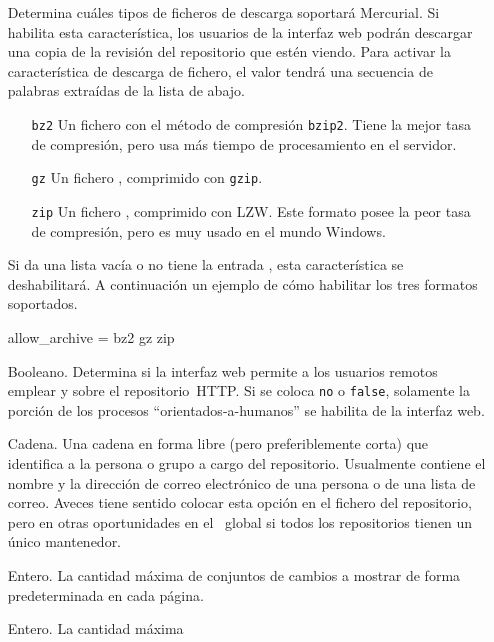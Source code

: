 \begin{itemize}
\item[\rcitem{web}{allow\_archive}] Determina cuáles tipos de ficheros
  de descarga soportará Mercurial.  Si habilita esta característica,
  los usuarios de la interfaz web podrán descargar una copia de la
  revisión del repositorio que estén viendo. Para activar la
  característica de descarga de fichero, el valor tendrá una secuencia
  de palabras extraídas de la lista de abajo.
  \begin{itemize}
  \item[\texttt{bz2}] Un fichero  con el método de
    compresión \texttt{bzip2}.  Tiene la mejor tasa de compresión,
    pero usa más tiempo de procesamiento en el servidor.
  \item[\texttt{gz}] Un fichero , comprimido con
    \texttt{gzip}.
  \item[\texttt{zip}] Un fichero , comprimido con LZW.
    Este formato posee la peor tasa de compresión, pero es muy usado en
    el mundo Windows.
  \end{itemize}
  Si da una lista vacía o no tiene la entrada
  , esta característica se deshabilitará.
  A continuación un ejemplo de cómo habilitar los tres formatos soportados.
  \begin{codesample4}
    [web]
    allow_archive = bz2 gz zip
  \end{codesample4}
\item[\rcitem{web}{allowpull}] Booleano.  Determina si la interfaz web
  permite a los usuarios remotos emplear  y 
  sobre el repositorio~HTTP.  Si se coloca \texttt{no} o
  \texttt{false}, solamente la porción de los procesos
  ``orientados-a-humanos'' se habilita de la interfaz web.
\item[\rcitem{web}{contact}] Cadena.  Una cadena en forma libre (pero
  preferiblemente corta) que identifica a la persona o grupo a cargo
  del repositorio.  Usualmente contiene el nombre y la dirección de
  correo electrónico de una persona o de una lista de correo.  Aveces
  tiene sentido colocar esta opción en el fichero 
  del repositorio, pero en otras oportunidades en el \hgrc\ global si
  todos los repositorios tienen un único mantenedor.
\item[\rcitem{web}{maxchanges}] Entero.  La cantidad máxima de
  conjuntos de cambios a mostrar de forma predeterminada en cada página.
\item[\rcitem{web}{maxfiles}] Entero.  La cantidad máxima

\end{itemize}
